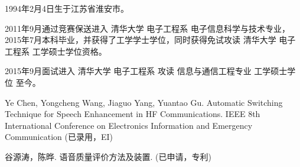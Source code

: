 \begin{resume}


1994年2月4日生于江苏省淮安市。

2011年9月通过竞赛保送进入 清华大学 电子工程系 电子信息科学与技术专业，2015年7月本科毕业，并获得了工学学士学位，同时获得免试攻读 清华大学 电子工程系 工学硕士学位资格。

2015年9月面试进入 清华大学 电子工程系 攻读 信息与通信工程专业 工学硕士学位 至今。


\begin{publications}
\item Ye Chen, Yongcheng Wang, Jiaguo Yang, Yuantao Gu. Automatic Switching Technique for Speech Enhancement in HF Communications. IEEE 8th International Conference on Electronics Information and Emergency Communication (已录用，EI)
\item 谷源涛，陈晔. 语音质量评价方法及装置. (已申请，专利)
\end{publications}

\end{resume}
